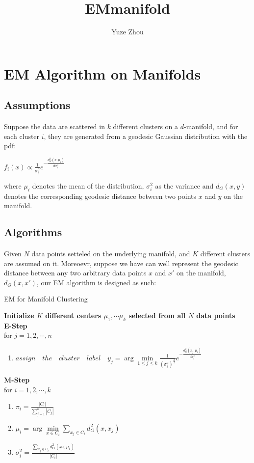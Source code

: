 \documentclass{article}
\title{EMmanifold}
\author{Yuze Zhou}
\begin{document}
\section{EM Algorithm on Manifolds}
\subsection{Assumptions}
\paragraph{}Suppose the data are scattered in $k$ different clusters on a $d$-manifold, and for each cluster $i$, they are generated from a geodesic Gaussian distribution with the pdf:\\
\begin{center}
$f_{i}(x) \propto \frac{1}{\sigma_{i}^{d}}e^{-\frac{d_{G}^{2}(x,\mu_{i})}{d\sigma_{i}^{2}}}$
\end{center}
where $\mu_{i}$ denotes the mean of the distribution, $\sigma_{i}^{2}$ as the variance and $d_{G}(x,y)$ denotes the corresponding geodesic distance between two points $x$ and $y$ on the manifold.
\subsection{Algorithms}
\paragraph{}Given $N$ data points setteled on the underlying manifold, and $K$ different clusters are assumed on it. Moreoevr, suppose we have can well represent the geodesic distance between any two arbitrary data points $x$ and $x'$ on the manifold, $d_{G}(x,x')$, our EM algorithm is designed as such:\\
\begin{center}
\begin{algorithm}[H]
\caption{EM for Manifold Clustering}
\textbf{Initialize $K$ different centers $\mu_{1}, \cdots \mu_{k}$ selected from all $N$ data points}\\
\textbf{E-Step}\\
for $j=1,2,\cdots,n$\\
\begin{enumerate}
\item $assign \quad the \quad cluster \quad label \quad y_{j} = \arg\min\limits_{1 \leq j \leq k} \frac{1}{(\sigma_{i}^{2})^{\frac{d}{2}}} e^{-\frac{d_{G}^{2}(x_{j},\mu_{i})}{d\sigma_{i}^{2}}}$
\end{enumerate}
\textbf{M-Step}\\
for $i=1,2,\cdots,k$\\
\begin{enumerate}
  \item $\pi_{i} = \frac{|C_{i}|}{\sum\limits_{j=1}^{k}|C_{j}|}$
  \item $\mu_{i} = \arg\min\limits_{x \in C_{i}} \sum\limits_{x_{j} \in C_{i}}d_{G}^{2}(x,x_{j})$
  \item $\sigma_{i}^{2} = \frac{\sum\limits_{x_{j} \in C_{i}}d_{G}^{2}(x_{j},\mu_{i})}{|C_{i}|}$
\end{enumerate}
\end{algorithm}
\end{center}
\end{document}
